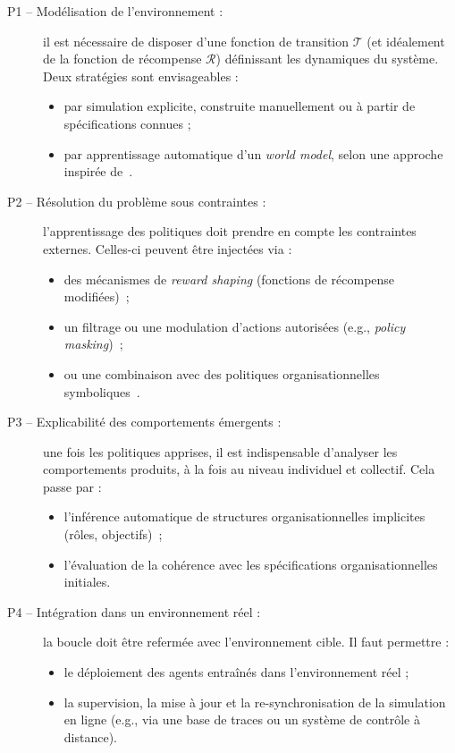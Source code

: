 \begin{description}
    \item[P1 -- Modélisation de l'environnement :] il est nécessaire de disposer d'une fonction de transition \(\mathcal{T}\) (et idéalement de la fonction de récompense \(\mathcal{R}\)) définissant les dynamiques du système. Deux stratégies sont envisageables :
        \begin{itemize}
            \item par simulation explicite, construite manuellement ou à partir de spécifications connues ;
            \item par apprentissage automatique d'un \textit{world model}, selon une approche inspirée de~\cite{Ha2018}.
        \end{itemize}

    \item[P2 -- Résolution du problème  sous contraintes :] l'apprentissage des politiques doit prendre en compte les contraintes externes. Celles-ci peuvent être injectées via :
        \begin{itemize}
            \item des mécanismes de \textit{reward shaping} (fonctions de récompense modifiées)~\cite{Ng1999};
            \item un filtrage ou une modulation d'actions autorisées (e.g., \textit{policy masking})~\cite{ElsayedAly2021};
            \item ou une combinaison avec des politiques organisationnelles symboliques~\cite{Boella2006,Hubner2004}.
        \end{itemize}

    \item[P3 -- Explicabilité des comportements émergents :] une fois les politiques apprises, il est indispensable d'analyser les comportements produits, à la fois au niveau individuel et collectif. Cela passe par :
        \begin{itemize}
            \item l'inférence automatique de structures organisationnelles implicites (rôles, objectifs)~\cite{Rahwan2003};
            \item l'évaluation de la cohérence avec les spécifications organisationnelles initiales.
        \end{itemize}

    \item[P4 -- Intégration dans un environnement réel :] la boucle doit être refermée avec l'environnement cible. Il faut permettre :
        \begin{itemize}
            \item le déploiement des agents entraînés dans l'environnement réel ;
            \item la supervision, la mise à jour et la re-synchronisation de la simulation en ligne (e.g., via une base de traces ou un système de contrôle à distance).
        \end{itemize}
\end{description}

